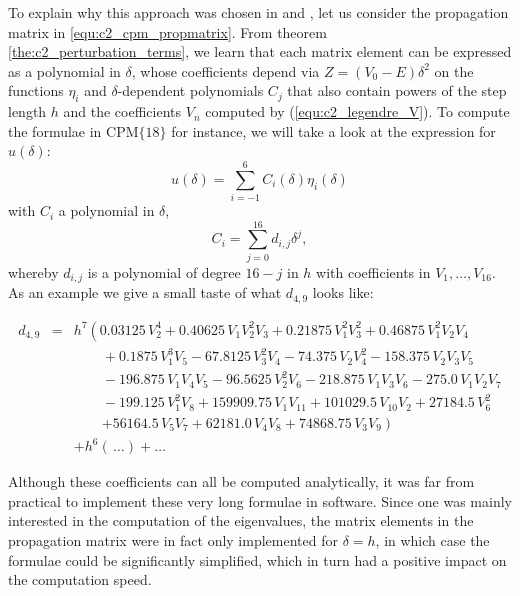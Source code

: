 To explain why this approach was chosen in \matslise{} and , let us consider the propagation matrix in \eqref{equ:c2_cpm_propmatrix}. From theorem \ref{the:c2_perturbation_terms}, we learn that each matrix element can be expressed as a polynomial in $\delta$, whose coefficients depend
via $Z=(V_0-E) \delta^2$ on the functions $\eta_i$ and $\delta$-dependent polynomials $C_j$ that also contain powers of the step length $h$ and the coefficients $V_n$ computed by (\ref{equ:c2_legendre_V}). To compute the formulae in $\text{CPM}\{18\}$ for instance, we will take a look at the expression for $u(\delta)$:
$$
    u(\delta) = \sum_{i = -1}^6 C_i(\delta) \eta_{i}(\delta)
$$
with $C_i$ a polynomial in $\delta$,
$$
    C_i  = \sum_{j=0}^{16} d_{i, j} \delta^j,
$$
whereby $d_{i, j}$ is a polynomial of degree $16-j$ in $h$ with coefficients in $V_1, \dots, V_{16}$. As an example we give a small taste of what $d_{4, 9}$ looks like:

\begin{eqnarray*}
    d_{4, 9}& =&  h^7 \left (0.03125 \, V_{2}^{4} + 0.40625 \, V_{1} V_{2}^{2} V_{3} + 0.21875 \, V_{1}^{2} V_{3}^{2} + 0.46875 \, V_{1}^{2} V_{2} V_{4} \right. \\
    &  & \qquad + 0.1875 \, V_{1}^{3} V_{5} - 67.8125 \, V_{3}^{2} V_{4} - 74.375 \, V_{2} V_{4}^{2} - 158.375 \, V_{2} V_{3} V_{5}         \\
    &  & \qquad - 196.875 \, V_{1} V_{4} V_{5} - 96.5625 \, V_{2}^{2} V_{6} - 218.875 \, V_{1} V_{3} V_{6} - 275.0 \, V_{1} V_{2} V_{7}     \\
    &  & \qquad - 199.125 \, V_{1}^{2} V_{8} + 159909.75 \, V_{1} V_{11} + 101029.5 \, V_{10} V_{2} + 27184.5 \, V_{6}^{2}                  \\
    &  & \qquad \left.+ 56164.5 \, V_{5} V_{7} + 62181.0 \, V_{4} V_{8} + 74868.75 \, V_{3} V_{9} \right)                                                 \\
    &  & + h^6 (\,\dots)  + \dots
\end{eqnarray*}


Although these coefficients can all be computed analytically, it was far from practical to implement these very long formulae in software. Since one was mainly interested in the computation of the eigenvalues, the matrix elements in the propagation matrix were in fact only implemented for $\delta=h$, in which case the formulae could be significantly simplified, which in turn had a positive impact on the computation speed.

